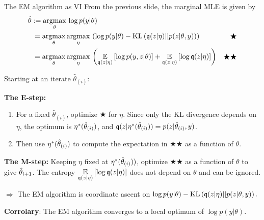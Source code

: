 \begin{frame}{The EM algorithm as VI}
%
From the previous slide, the marginal MLE is given by
%
\begin{align*}
%
\MoveEqLeft
\thetahat := \argmax{\theta} \log p(\y | \theta) \\
={}&
\argmax{\theta} \argmax{\eta} \left(
\log p(\y | \theta) -
    \kl{\q(\z | \eta)}{p(\z | \theta, \y)}  \right) & \bigstar
\\={}&
\argmax{\theta} \argmax{\eta} \left(
\expect{\q(\z | \eta)}{
    \log p(\y, \z | \theta) }
+ \expect{\q(\z | \eta)}{\log \q(\z | \eta)
}\right) & \bigstar\bigstar
%
\end{align*}
%

Starting at an iterate $\hat\theta_{(i)}$:

\textbf{The E-step:}
\begin{enumerate}
%
    \item For a fixed $\hat\theta_{(i)}$, optimize
$\bigstar$ for $\eta$.  Since only the KL divergence depends on
$\eta$, the optimum is $\eta^{*}(\hat\theta_{(i)})$,
and $\mathfrak{q}(z | \eta^{*}(\hat\theta_{(i)})) = p(z | \hat\theta_{(i)}, y)$.
%
    \item Then use $\eta^{*}(\hat\theta_{(i)})$ to compute the expectation in
$\bigstar\bigstar$ as a function of $\theta$.
%
\end{enumerate}

\textbf{The M-step:}  Keeping $\eta$ fixed at $\eta^{*}(\hat\theta_{(i)}))$,
optimize $\bigstar\bigstar$ as a function of $\theta$ to give
$\hat\theta_{i + 1}$.  The entropy
$\underset{\mathfrak{q}(z | \eta)}{\mathbb{E}}\left[\log \mathfrak{q}(z | \eta)\right]$ does not depend on $\theta$
and can be ignored.

\hrulefill

$\Rightarrow$ The EM algorithm is coordinate ascent on 
%
%
$\log p(y | \theta) - \mathrm{KL}\left(\mathfrak{q}(z | \eta) || p(z | \theta, y) \right).$
%
%

\textbf{Corrolary}: The EM algorithm converges to a local optimum of $\log p(y |
\theta)$.

\end{frame}
